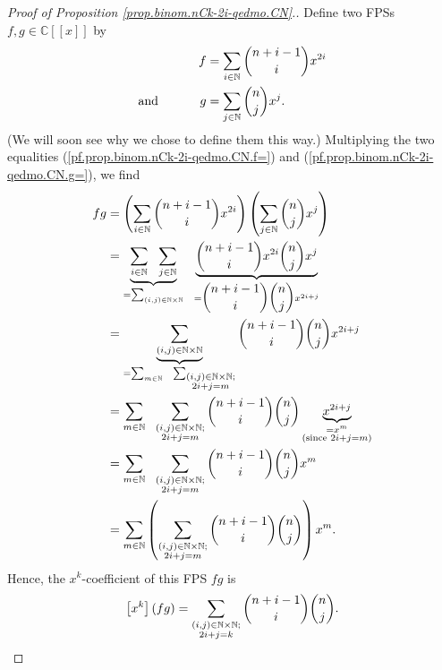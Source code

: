 \begin{proof}
[Proof of Proposition \ref{prop.binom.nCk-2i-qedmo.CN}.]Define two FPSs
$f,g\in\mathbb{C}\left[  \left[  x\right]  \right]  $ by
\begin{align}
f  &  =\sum_{i\in\mathbb{N}}\dbinom{n+i-1}{i}x^{2i}%
\label{pf.prop.binom.nCk-2i-qedmo.CN.f=}\\
\text{and}\ \ \ \ \ \ \ \ \ \ g  &  =\sum_{j\in\mathbb{N}}\dbinom{n}{j}x^{j}.
\label{pf.prop.binom.nCk-2i-qedmo.CN.g=}%
\end{align}
(We will soon see why we chose to define them this way.) Multiplying the two
equalities (\ref{pf.prop.binom.nCk-2i-qedmo.CN.f=}) and
(\ref{pf.prop.binom.nCk-2i-qedmo.CN.g=}), we find%
\begin{align*}
fg  &  =\left(  \sum_{i\in\mathbb{N}}\dbinom{n+i-1}{i}x^{2i}\right)  \left(
\sum_{j\in\mathbb{N}}\dbinom{n}{j}x^{j}\right) \\
&  =\underbrace{\sum_{i\in\mathbb{N}}\ \ \sum_{j\in\mathbb{N}}}_{=\sum
_{\left(  i,j\right)  \in\mathbb{N}\times\mathbb{N}}}\ \ \underbrace{\dbinom
{n+i-1}{i}x^{2i}\dbinom{n}{j}x^{j}}_{=\dbinom{n+i-1}{i}\dbinom{n}{j}x^{2i+j}%
}\\
&  =\underbrace{\sum_{\left(  i,j\right)  \in\mathbb{N}\times\mathbb{N}}%
}_{=\sum_{m\in\mathbb{N}}\ \ \sum_{\substack{\left(  i,j\right)  \in
\mathbb{N}\times\mathbb{N};\\2i+j=m}}}\dbinom{n+i-1}{i}\dbinom{n}{j}x^{2i+j}\\
&  =\sum_{m\in\mathbb{N}}\ \ \sum_{\substack{\left(  i,j\right)  \in
\mathbb{N}\times\mathbb{N};\\2i+j=m}}\dbinom{n+i-1}{i}\dbinom{n}%
{j}\underbrace{x^{2i+j}}_{\substack{=x^{m}\\\text{(since }2i+j=m\text{)}}}\\
&  =\sum_{m\in\mathbb{N}}\ \ \sum_{\substack{\left(  i,j\right)  \in
\mathbb{N}\times\mathbb{N};\\2i+j=m}}\dbinom{n+i-1}{i}\dbinom{n}{j}x^{m}\\
&  =\sum_{m\in\mathbb{N}}\left(  \sum_{\substack{\left(  i,j\right)
\in\mathbb{N}\times\mathbb{N};\\2i+j=m}}\dbinom{n+i-1}{i}\dbinom{n}{j}\right)
x^{m}.
\end{align*}
Hence, the $x^{k}$-coefficient of this FPS $fg$ is%
\begin{equation}
\left[  x^{k}\right]  \left(  fg\right)  =\sum_{\substack{\left(  i,j\right)
\in\mathbb{N}\times\mathbb{N};\\2i+j=k}}\dbinom{n+i-1}{i}\dbinom{n}{j}.
\label{pf.prop.binom.nCk-2i-qedmo.CN.3}%
\end{equation}



\end{proof}
